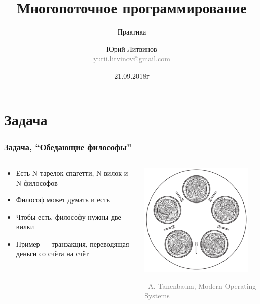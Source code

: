 \documentclass[xetex,mathserif,serif]{beamer}
\title{Многопоточное программирование}
\subtitle{Практика}
\author[Юрий Литвинов]{Юрий Литвинов\\\small{\textcolor{gray}{yurii.litvinov@gmail.com}}}
\date{21.09.2018г}
\newcommand{\attribution}[1] {
\vspace{-2mm}\begin{flushright}\begin{scriptsize}\textcolor{gray}{\textcopyright\, #1}\end{scriptsize}\end{flushright}
}
\begin{document}
	\frame{\titlepage}

	\section{Задача}

	\begin{frame}
		\frametitle{Задача, ``Обедающие философы''}
		\begin{columns}
			\begin{column}{0.5\textwidth}
				\begin{itemize}
					\item Есть N тарелок спагетти, N вилок и N философов
					\item Философ может думать и есть
					\item Чтобы есть, философу нужны две вилки
					\item Пример --- транзакция, переводящая деньги со счёта на счёт
				\end{itemize}
			\end{column}
			\begin{column}{0.5\textwidth}
				\includegraphics[width=0.9\textwidth]{diningPhilosophers.png}
				\attribution{A. Tanenbaum, Modern Operating Systems}
			\end{column}
		\end{columns}
	\end{frame}
\end{document}
